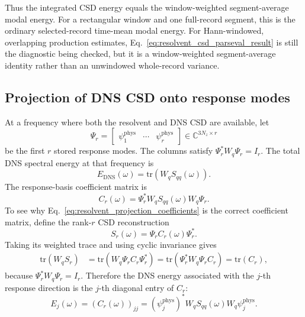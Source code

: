 \documentclass[11pt]{article}
\begin{document}
Thus the integrated CSD energy equals the window-weighted segment-average
modal energy. For a rectangular window and one full-record segment, this is
the ordinary selected-record time-mean modal energy. For Hann-windowed,
overlapping production estimates, Eq.~\eqref{eq:resolvent_csd_parseval_result}
is still the diagnostic being checked, but it is a window-weighted
segment-average identity rather than an unwindowed whole-record variance.

\subsection{Projection of DNS CSD onto response modes}

At a frequency where both the resolvent and DNS CSD are available, let
\[
  \Psi_r =
  \begin{bmatrix}
  \psi_1^{\mathrm{phys}} & \cdots & \psi_r^{\mathrm{phys}}
  \end{bmatrix}
  \in\mathbb{C}^{3N_z\times r}
\]
be the first \(r\) stored response modes. The columns satisfy
\(\Psi_r^*W_q\Psi_r=I_r\). The total DNS spectral energy at that frequency is
\begin{equation}
  E_{\mathrm{DNS}}(\omega)
  =
  \mathrm{tr}\!\left(W_qS_{qq}(\omega)\right).
  \label{eq:resolvent_projection_total_energy}
\end{equation}
The response-basis coefficient matrix is
\begin{equation}
  C_r(\omega)
  =
  \Psi_r^*W_qS_{qq}(\omega)W_q\Psi_r.
  \label{eq:resolvent_projection_coefficients}
\end{equation}
To see why Eq.~\eqref{eq:resolvent_projection_coefficients} is the correct
coefficient matrix, define the rank-\(r\) CSD reconstruction
\begin{equation}
  S_r(\omega)=\Psi_r C_r(\omega)\Psi_r^*.
  \label{eq:resolvent_projection_reconstruction}
\end{equation}
Taking its weighted trace and using cyclic invariance gives
\begin{align}
  \mathrm{tr}\!\left(W_qS_r\right)
  &=
  \mathrm{tr}\!\left(W_q\Psi_r C_r\Psi_r^*\right)
  =
  \mathrm{tr}\!\left(\Psi_r^*W_q\Psi_r C_r\right)
  =
  \mathrm{tr}\!\left(C_r\right),
  \label{eq:resolvent_projection_energy_trace}
\end{align}
because \(\Psi_r^*W_q\Psi_r=I_r\). Therefore the DNS energy associated with
the \(j\)-th response direction is the \(j\)-th diagonal entry of \(C_r\):
\begin{equation}
  E_j(\omega)
  =
  \left(C_r(\omega)\right)_{jj}
  =
  \left(\psi_j^{\mathrm{phys}}\right)^*
  W_qS_{qq}(\omega)W_q
  \psi_j^{\mathrm{phys}}.
  \label{eq:resolvent_projection_single_energy}
\end{equation}
\end{document}
